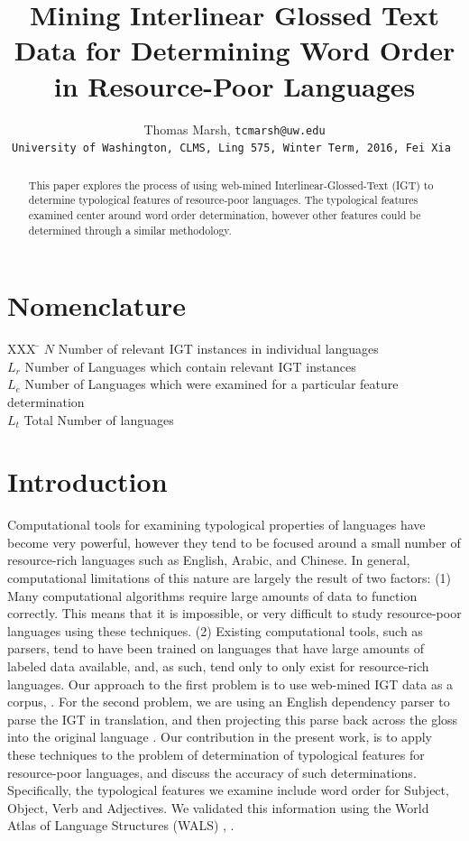 \documentclass[]{aiaa-tc}
\title{Mining Interlinear Glossed Text Data for Determining Word Order in Resource-Poor Languages}
\author{
  Thomas Marsh, \tt{tcmarsh@uw.edu}\\ University of Washington, CLMS, Ling 575, Winter Term, 2016, Fei Xia
 }
\begin{document}
\maketitle

\begin{abstract}
This paper explores the process of using web-mined Interlinear-Glossed-Text (IGT) to determine typological features of resource-poor languages.  The typological features examined center around word order determination, however other features could be determined through a similar methodology.
\end{abstract}

\section*{Nomenclature}

\begin{tabbing}
  XXX \= \kill%
  $N$ \> Number of relevant IGT instances in individual languages \\
  $L_r$ \> Number of Languages which contain relevant IGT instances \\
  $L_e$ \> Number of Languages which were examined for a particular feature determination \\
  $L_t$ \> Total Number of languages \\
 \end{tabbing}

\section{Introduction}

Computational tools for examining typological properties of languages have become very powerful, however they tend to be focused around a small number of resource-rich languages such as English, Arabic, and Chinese.  In general, computational limitations of this nature are largely the result of two factors:   (1) Many computational algorithms require large amounts of data to function correctly.  This means that it is impossible, or very difficult to study resource-poor languages using these techniques.  (2) Existing computational tools, such as parsers, tend to have been trained on languages that have large amounts of labeled data available, and, as such, tend only to only exist for resource-rich languages.  Our approach to the first problem is to use web-mined IGT data as a corpus, \cite{lewis2006odin}.  For the second problem, we are using an English dependency parser \cite{de2006generating} to parse the IGT in translation, and then projecting this parse back across the gloss into the original language \cite{xia2007multilingual}.  Our contribution in the present work, is to apply these techniques to the problem of  determination of typological features for resource-poor languages, and discuss the accuracy of such determinations.  Specifically, the typological features we examine include word order for Subject, Object, Verb and Adjectives.  We validated this information using the World Atlas of Language Structures (WALS) \cite{wals}, \cite{haspelmath2005world}.
\end{document}

